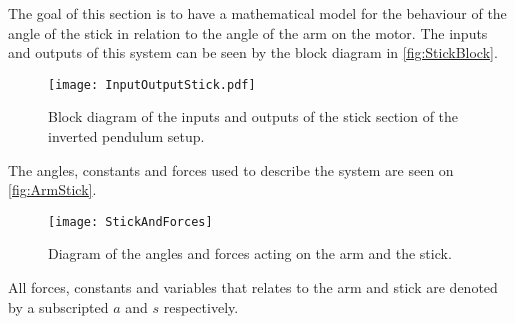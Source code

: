 \graphicspath{{figures/modeling/ArmStick/}}
The goal of this section is to have a mathematical model for the behaviour of the angle of the stick in relation to the angle of the arm on the motor. The inputs and outputs of this system can be seen by the block diagram in \autoref{fig:StickBlock}.
\begin{figure}[htbp]
\centering
\texttt{[image: InputOutputStick.pdf]}
\caption{Block diagram of the inputs and outputs of the stick section of the inverted pendulum setup.}
\label{fig:StickBlock}
\end{figure}

The angles, constants and forces used to describe the system are seen on \autoref{fig:ArmStick}.
\begin{figure}[htbp]
\centering
\texttt{[image: StickAndForces]}
\caption{Diagram of the angles and forces acting on the arm and the stick.}
\label{fig:ArmStick}
\end{figure}
\startexplain
\stopexplain
{}
All forces, constants and variables that relates to the arm and stick are denoted by a subscripted $a$ and $s$ respectively. 

